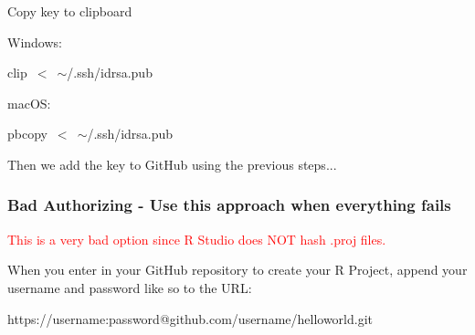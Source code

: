 \documentclass{beamer}\usepackage[]{graphicx}\usepackage[]{color}
\makeatletter
\newcommand{\hlopt}[1]{\textcolor[rgb]{0,0,0}{#1}}%
\newcommand{\hlstd}[1]{\textcolor[rgb]{0.345,0.345,0.345}{#1}}%
\newcommand{\hlkwc}[1]{\textcolor[rgb]{0.333,0.667,0.333}{#1}}%
\newenvironment{kframe}{%
 \def\at@end@of@kframe{}%
 \ifinner\ifhmode%
  \def\at@end@of@kframe{\end{minipage}}%
  \begin{minipage}{\columnwidth}%
 \fi\fi%
 \def\FrameCommand##1{\hskip\@totalleftmargin \hskip-\fboxsep
 \colorbox{shadecolor}{##1}\hskip-\fboxsep
     \hskip-\linewidth \hskip-\@totalleftmargin \hskip\columnwidth}%
 \MakeFramed {\advance\hsize-\width
   \@totalleftmargin\z@ \linewidth\hsize
   \@setminipage}}%
 {\par\unskip\endMakeFramed%
 \at@end@of@kframe}
\newenvironment{knitrout}{}{} %
\makeatother
\begin{document}
\begin{frame}[fragile]

Copy key to clipboard

Windows:
\begin{knitrout}\footnotesize
{}\color{fgcolor}\begin{kframe}
\noindent
\ttfamily
\hlstd{clip\ }\hlopt{$<$\ }\hlstd{$\sim$}\hlopt{/}\hlstd{.}\hlkwc{ssh}\hlstd{}\hlopt{/}\hlstd{id\textunderscore rsa.pub}\hspace*{\fill}
\mbox{}
\normalfont
\end{kframe}
\end{knitrout}

macOS:
\begin{knitrout}\footnotesize
{}\color{fgcolor}\begin{kframe}
\noindent
\ttfamily
\hlstd{pbcopy\ }\hlopt{$<$\ }\hlstd{$\sim$}\hlopt{/}\hlstd{.}\hlkwc{ssh}\hlstd{}\hlopt{/}\hlstd{id\textunderscore rsa.pub}\hspace*{\fill}
\mbox{}
\normalfont
\end{kframe}
\end{knitrout}

Then we add the key to GitHub using the previous steps... 
\end{frame}

\begin{frame}[fragile]
\frametitle{Bad Authorizing - Use this approach when everything fails}

\begin{center}
\textcolor{red}{This is a very bad option since R Studio does NOT hash .proj files.}
\end{center}

When you enter in your GitHub repository to create your R Project, append your username and password like so to the URL:
\begin{knitrout}
\color{fgcolor}\begin{kframe}
\noindent
\ttfamily
\hlstd{https}\hlopt{://}\hlstd{username}\hlopt{:}\hlstd{password@github.com}\hlopt{/}\hlstd{username}\hlopt{/}\hlstd{helloworld.git}\hspace*{\fill}
\mbox{}
\normalfont
\end{kframe}
\end{knitrout}
\end{frame}
\end{document}
